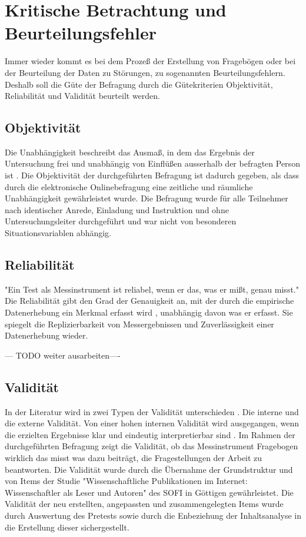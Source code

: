\section{Kritische Betrachtung und Beurteilungsfehler}

Immer wieder kommt es bei dem Prozeß der Erstellung von Fragebögen oder bei der Beurteilung der Daten zu Störungen, zu sogenannten Beurteilungsfehlern. Deshalb soll die Güte der Befragung durch die Gütekriterien Objektivität, Reliabilität und Validität beurteilt werden.

\subsection{Objektivität}

Die Unabhängigkeit beschreibt das Ausmaß, in dem das Ergebnis der Untersuchung frei und unabhängig von Einflüßen ausserhalb der befragten Person ist \cite{rost_2004_lehrbuch}. Die Objektivität der durchgeführten Befragung ist dadurch gegeben, als dass durch die elektronische Onlinebefragung eine zeitliche und räumliche Unabhängigkeit gewährleistet wurde. Die Befragung wurde für alle Teilnehmer nach identischer Anrede, Einladung und Instruktion und ohne Untersuchungsleiter durchgeführt und war nicht von besonderen Situationsvariablen abhängig.

\subsection{Reliabilität}

"Ein Test als Messinstrument ist reliabel, wenn er das, was er mißt, genau misst." \cite{schelten_1997_testbeurteilung} Die Reliabilität gibt den Grad der Genauigkeit an, mit der durch die empirische Datenerhebung ein Merkmal erfasst wird \cite{rost_2004_lehrbuch}, unabhängig davon was er erfasst. Sie spiegelt die Replizierbarkeit von Messergebnissen und Zuverlässigkeit einer Datenerhebung wieder.

--- TODO weiter ausarbeiten----

\subsection{Validität}
In der Literatur wird in zwei Typen der Validität unterschieden \cite{rost_2004_lehrbuch}. Die interne und die externe Validität. Von einer hohen internen Validität wird ausgegangen, wenn die erzielten Ergebnisse klar und eindeutig interpretierbar sind \cite{raab_2012_fragebogen}. Im Rahmen der durchgeführten Befragung zeigt die Validität, ob das Messinstrument Fragebogen wirklich das misst was dazu beiträgt, die Fragestellungen der Arbeit zu beantworten. Die Validität wurde durch die Übernahme der Grundstruktur und von Items der Studie "Wissenschaftliche Publikationen im Internet: Wissenschaftler als Leser und Autoren" des SOFI in Göttigen gewährleistet. Die Validität der neu erstellten, angepassten  und zusammengelegten Items wurde durch Auswertung des Pretests sowie durch die Enbeziehung der Inhaltsanalyse in die Erstellung dieser sichergestellt.


